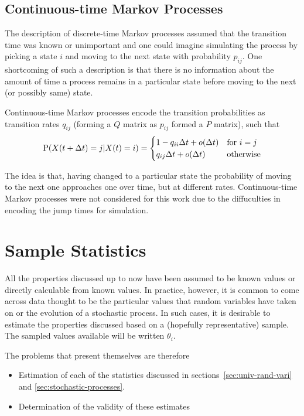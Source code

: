 \subsection{Continuous-time Markov Processes}
The description of discrete-time Markov processes assumed that the transition time was known or unimportant and one could imagine simulating the process by picking a state $i$ and moving to the next state with probability $p_{ij}$.  
One shortcoming of such a description is that there is no information about the amount of time a process remains in a particular state before moving to the next (or possibly same) state.  

Continuous-time Markov processes encode the transition probabilities as transition rates $q_{ij}$ (forming a $Q$ matrix as $p_{ij}$ formed a $P$ matrix), such that
\begin{equation}
  \label{eq:contmarkov}
  \mathrm{P}(X(t+\Delta t) = j | X(t) = i) = 
  \begin{cases}
    1 - q_{ii}\Delta t + o(\Delta t) & \text{for } i = j \\
    q_{ij}\Delta t + o(\Delta t) & \text{otherwise}
  \end{cases}
\end{equation}

The idea is that, having changed to a particular state the probability of moving to the next one approaches one over time, but at different rates.
Continuous-time Markov processes were not considered for this work due to the diffuculties in encoding the jump times for simulation.

\section{Sample Statistics}
All the properties discussed up to now have been assumed to be known values or directly calculable from known values.
In practice, however, it is common to come across data thought to be the particular values that random variables have taken on or the evolution of a stochastic process.
In such cases, it is desirable to estimate the properties discussed based on a (hopefully representative) sample.
The sampled values available will be written $\theta_i$.

The problems that present themselves are therefore
\begin{itemize}
\item Estimation of each of the statistics discussed in sections~\ref{sec:univ-rand-vari} and \ref{sec:stochastic-processes}.
\item Determination of the validity of these estimates
\end{itemize}

